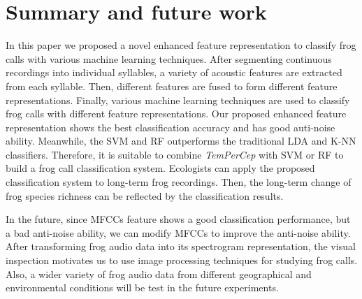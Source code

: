\section{Summary and future work}
In this paper we proposed a novel enhanced feature representation to classify frog calls with various machine learning techniques. After segmenting continuous recordings into individual syllables, a variety of acoustic features are extracted from each syllable. Then, different features are fused to form different feature representations. Finally, various machine learning techniques are used to classify frog calls with different feature representations.
Our proposed enhanced feature representation shows the best classification accuracy and has good auti-noise ability. Meanwhile, the SVM and RF outperforms the traditional LDA and K-NN classifiers. Therefore, it is suitable to combine \textit{TemPerCep} with SVM or RF to build a frog call classification system. Ecologists can apply the proposed classification system to long-term frog recordings. Then, the long-term change of frog species richness can be reflected by the classification results. 

In the future, since MFCCs feature shows a good classification performance, but a bad anti-noise ability, we can modify MFCCs to improve the anti-noise ability. After transforming  frog audio data into its spectrogram representation, the visual inspection motivates us to use image processing techniques for studying frog calls. Also, a wider variety of frog audio data from different geographical and environmental conditions will be test in the future experiments.
